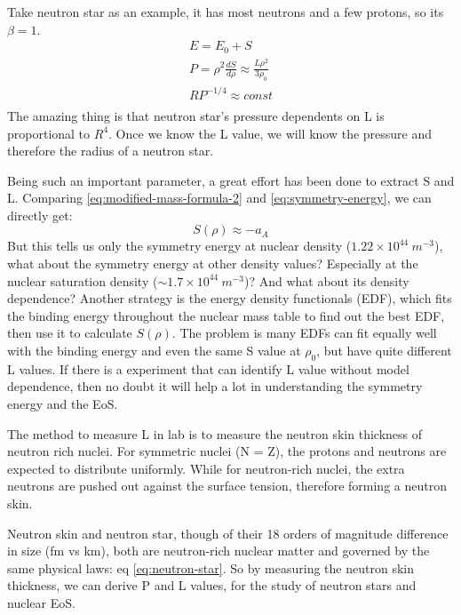 Take neutron star \cite{Lattimer.2001} as an example, it has most neutrons and 
a few protons, so its $\beta = 1$.
\begin{equation}
    \label{eq:neutron-star}
    \begin{aligned}
	 E = E_0 + S	\\
	 P = \rho^2 \frac{dS}{d\rho} \approx \frac{L\rho^2}{3\rho_0}	\\
	 RP^{-1/4} \approx const    \\
    \end{aligned}
\end{equation}
The amazing thing is that neutron star's pressure dependents on L is proportional
to $R^4$. Once we know the L value, we will know the pressure and therefore the 
radius of a neutron star. %

Being such an important parameter, a great effort has been done to extract S 
and L. Comparing \eqref{eq:modified-mass-formula-2} and \eqref{eq:symmetry-energy},
we can directly get:
\begin{equation}
    S(\rho) \approx -a_A
\end{equation}
But this tells us only the symmetry energy at nuclear density ($1.22 \times 10^{44}\ m^{-3}$),
what about the symmetry energy at other density values? Especially at the nuclear
saturation density ($\sim 1.7 \times 10^{44}\ m^{-3}$)? And what about its density
dependence? Another strategy is the energy density functionals (EDF), which fits
the binding energy throughout the nuclear mass table to find out the best EDF,
then use it to calculate $S(\rho)$. The problem is many EDFs can fit equally well
with the binding energy and even the same S value at $\rho_0$, but have quite 
different L values. If there is a experiment that can identify L value without 
model dependence, then no doubt it will help a lot in understanding the symmetry 
energy and the EoS.

The method to measure L in lab is to measure the neutron skin thickness of 
neutron rich nuclei. For symmetric nuclei (N = Z), the protons and neutrons are
expected to distribute uniformly. While for neutron-rich nuclei, the extra 
neutrons are pushed out against the surface tension\cite{PRL.85.5296}, therefore
forming a neutron skin. 

Neutron skin and neutron star, though of their 18 orders of magnitude difference 
in size (fm vs km), both are neutron-rich nuclear matter and governed by the 
same physical laws: eq \eqref{eq:neutron-star}. So by measuring the neutron
skin thickness, we can derive P and L values, for the study of neutron stars
and nuclear EoS.


